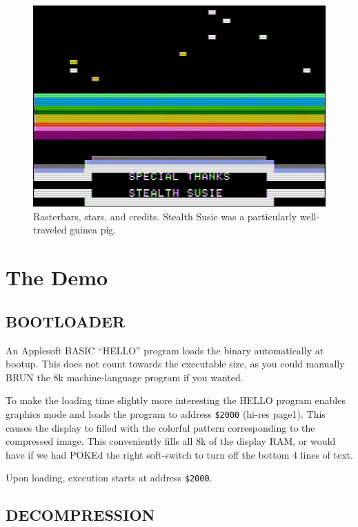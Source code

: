 \documentclass[twocolumn]{article}
\begin{document}
\begin{figure}[tb]
\begin{center}
\includegraphics[width=\columnwidth]{figures/m7_screen2.jpg}
\end{center}
\caption{Rasterbars, stars, and credits.  Stealth Susie was a particularly
well-traveled guinea pig.
\label{fig:credits}}
\end{figure}


\section{The Demo}

\subsection{BOOTLOADER}

An Applesoft BASIC ``HELLO'' program loads the binary automatically at bootup.
This does not count towards the executable size, as you could manually BRUN 
the 8k machine-language program if you wanted.

To make the loading time slightly more interesting the HELLO program enables
graphics mode and loads the program to address {\tt \$2000} (hi-res page1).
This causes the display to filled with the colorful pattern corresponding
to the compressed image.
This conveniently fills all 8k of the display RAM, or would have
if we had POKEd the right soft-switch to turn off
the bottom 4 lines of text.

Upon loading, execution starts at address {\tt \$2000}.

\subsection{DECOMPRESSION}
\end{document}
